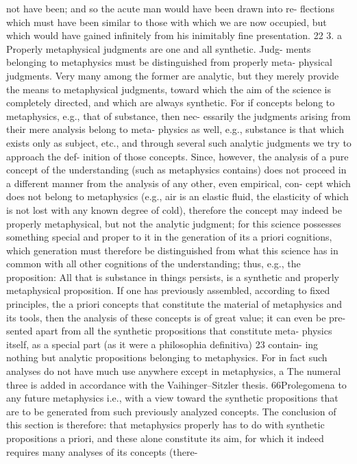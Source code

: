 not have been; and so the acute man would have been drawn into re-
ﬂections which must have been similar to those with which we are now
occupied, but which would have gained inﬁnitely from his inimitably
ﬁne presentation. 22
3. a Properly metaphysical judgments are one and all synthetic. Judg-
ments belonging to metaphysics must be distinguished from properly meta-
physical judgments. Very many among the former are analytic, but they
merely provide the means to metaphysical judgments, toward which the
aim of the science is completely directed, and which are always synthetic.
For if concepts belong to metaphysics, e.g., that of substance, then nec-
essarily the judgments arising from their mere analysis belong to meta-
physics as well, e.g., substance is that which exists only as subject, etc.,
and through several such analytic judgments we try to approach the def-
inition of those concepts. Since, however, the analysis of a pure concept
of the understanding (such as metaphysics contains) does not proceed in
a different manner from the analysis of any other, even empirical, con-
cept which does not belong to metaphysics (e.g., air is an elastic ﬂuid, the
elasticity of which is not lost with any known degree of cold), therefore
the concept may indeed be properly metaphysical, but not the analytic
judgment; for this science possesses something special and proper to it in
the generation of its a priori cognitions, which generation must therefore
be distinguished from what this science has in common with all other
cognitions of the understanding; thus, e.g., the proposition: All that is
substance in things persists, is a synthetic and properly metaphysical
proposition.
If one has previously assembled, according to ﬁxed principles, the a
priori concepts that constitute the material of metaphysics and its tools,
then the analysis of these concepts is of great value; it can even be pre-
sented apart from all the synthetic propositions that constitute meta-
physics itself, as a special part (as it were a philosophia deﬁnitiva) 23 contain-
ing nothing but analytic propositions belonging to metaphysics. For in
fact such analyses do not have much use anywhere except in metaphysics,
a
The numeral three is added in accordance with the Vaihinger–Sitzler thesis.
66Prolegomena to any future metaphysics
i.e., with a view toward the synthetic propositions that are to be generated
from such previously analyzed concepts.
The conclusion of this section is therefore: that metaphysics properly
has to do with synthetic propositions a priori, and these alone constitute
its aim, for which it indeed requires many analyses of its concepts (there-
